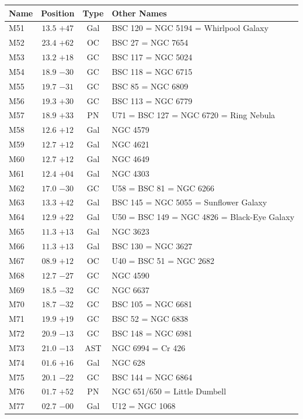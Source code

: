 \begin{table}[t]
    \setlength{\tabcolsep}{2pt}
    \footnotesize
    \begin{tabularx}{\linewidth}{lccX}
        \hline
        Name&Position&Type&Other Names\\
        \hline

M51  &$13.5$ $+47$&Gal&BSC 120 = NGC 5194 = Whirlpool Galaxy\\
M52  &$23.4$ $+62$&OC &BSC 27 = NGC 7654\\
M53  &$13.2$ $+18$&GC &BSC 117 = NGC 5024\\
M54  &$18.9$ $-30$&GC &BSC 118 = NGC 6715\\
M55  &$19.7$ $-31$&GC &BSC 85 = NGC 6809\\
M56  &$19.3$ $+30$&GC &BSC 113 = NGC 6779\\
M57  &$18.9$ $+33$&PN &U71 = BSC 127 = NGC 6720 = Ring Nebula\\
M58  &$12.6$ $+12$&Gal&NGC 4579\\
M59  &$12.7$ $+12$&Gal&NGC 4621\\
M60  &$12.7$ $+12$&Gal&NGC 4649\\
M61  &$12.4$ $+04$&Gal&NGC 4303\\
M62  &$17.0$ $-30$&GC &U58 = BSC 81 = NGC 6266\\
M63  &$13.3$ $+42$&Gal&BSC 145 = NGC 5055 = Sunflower Galaxy\\
M64  &$12.9$ $+22$&Gal&U50 = BSC 149 = NGC 4826 = Black-Eye Galaxy\\
M65  &$11.3$ $+13$&Gal&NGC 3623\\
M66  &$11.3$ $+13$&Gal&BSC 130 = NGC 3627\\
M67  &$08.9$ $+12$&OC &U40 = BSC 51 = NGC 2682\\
M68  &$12.7$ $-27$&GC &NGC 4590\\
M69  &$18.5$ $-32$&GC &NGC 6637\\
M70  &$18.7$ $-32$&GC &BSC 105 = NGC 6681\\
M71  &$19.9$ $+19$&GC &BSC 52 = NGC 6838\\
M72  &$20.9$ $-13$&GC &BSC 148 = NGC 6981\\
M73  &$21.0$ $-13$&AST&NGC 6994 = Cr 426\\
M74  &$01.6$ $+16$&Gal&NGC 628\\
M75  &$20.1$ $-22$&GC &BSC 144 = NGC 6864\\
M76  &$01.7$ $+52$&PN &NGC 651/650 = Little Dumbell\\
M77  &$02.7$ $-00$&Gal&U12 = NGC 1068\\

\end{tabularx}
\end{table}
